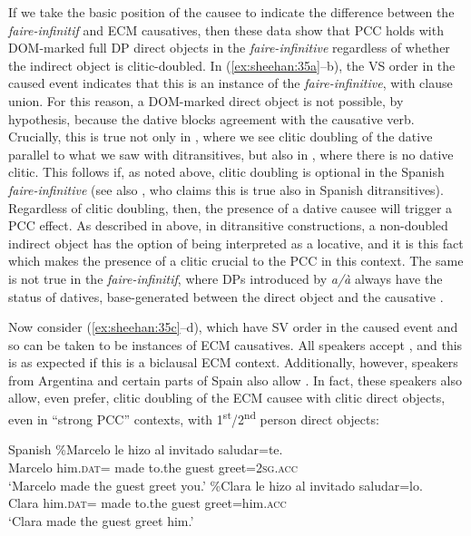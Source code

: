 \documentclass[output=paper,colorlinks,citecolor=brown,nonflat]{langsci/langscibook}
\begin{document}
If we take the basic position of the causee to indicate the difference between the \textit{faire-infinitif} and ECM causatives, then these data show that PCC holds with DOM-marked full DP direct objects in the \textit{faire-infinitive} regardless of whether the indirect object is clitic-doubled. In (\ref{ex:sheehan:35a}--b), the VS order in the caused event indicates that this is an instance of the \textit{faire-infinitive}, with clause union. For this reason, a DOM-marked direct object is not possible, by hypothesis, because the dative blocks agreement with the causative verb. Crucially, this is true not only in , where we see clitic doubling of the dative parallel to what we saw with ditransitives, but also in , where there is no dative clitic. This follows if, as noted above, clitic doubling is optional in the Spanish \textit{faire-infinitive} (see also \citealt{Pineda2013, Pineda2020}, who claims this is true also in Spanish ditransitives). Regardless of clitic doubling, then, the presence of a dative causee will trigger a PCC effect. As described in  above, in ditransitive constructions, a non-doubled indirect object has the option of being interpreted as a locative, and it is this fact which makes the presence of a clitic crucial to the PCC in this context. The same is not true in the \textit{faire-infinitif}, where DPs introduced by \textit{a/à} always have the status of datives, base-generated between the direct object and the causative {\liv}.

Now consider (\ref{ex:sheehan:35c}--d), which have SV order in the caused event and so can be taken to be instances of ECM causatives. All speakers accept , and this is as expected if this is a biclausal ECM context. Additionally, however, speakers from Argentina and certain parts of Spain also allow . In fact, these speakers also allow, even prefer, clitic doubling of the ECM causee with clitic direct objects, even in ``strong PCC'' contexts, with 1\textsuperscript{st}/2\textsuperscript{nd} person direct objects:

\ea%
    \label{ex:sheehan:36}
    Spanish
    \ea\label{ex:sheehan:36a}
    \gll    \%Marcelo   le   hizo   al   invitado saludar=te.\\
            Marcelo   him.\textsc{dat=}   made   to.the   guest  greet=\textsc{2sg}.\textsc{acc}\\
    \glt    ‘Marcelo made the guest greet you.’
    \ex\label{ex:sheehan:36b}
    \gll    \%Clara   le   hizo   al   invitado   saludar=lo.\\
            Clara   him.\textsc{dat=} made   to.the   guest   greet=him.\textsc{acc}\\
    \glt    ‘Clara made the guest greet him.’
    \z
\z
\end{document}
